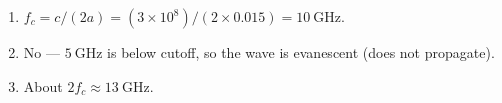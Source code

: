 \begin{enumerate}[leftmargin=1.6em,itemsep=2pt]
\item $f_c = c/(2a) = (3\times10^{8})/(2\times0.015) = 10\ \text{GHz}$.
\item No --- $5\ \text{GHz}$ is below cutoff, so the wave is evanescent (does not propagate).
\item About $2f_c \approx 13\ \text{GHz}$.
\end{enumerate}
